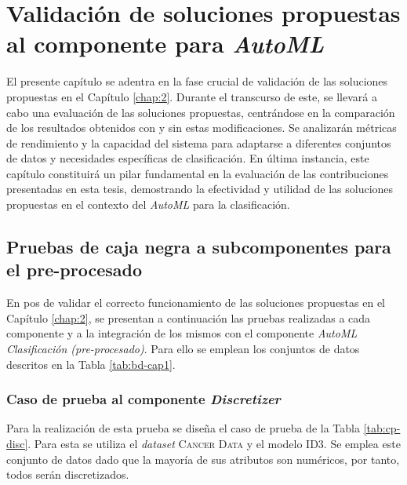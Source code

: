 \chapter{Validación de soluciones propuestas al componente para \textit{AutoML}}\label{chap:3}
El presente capítulo se adentra en la fase crucial de validación de las soluciones propuestas en el Capítulo \ref{chap:2}. Durante el transcurso de este, se llevará a cabo una evaluación de las soluciones propuestas, centrándose en la comparación de los resultados obtenidos con y sin estas modificaciones. Se analizarán métricas de rendimiento y la capacidad del sistema para adaptarse a diferentes conjuntos de datos y necesidades específicas de clasificación. En última instancia, este capítulo constituirá un pilar fundamental en la evaluación de las contribuciones presentadas en esta tesis, demostrando la efectividad y utilidad de las soluciones propuestas en el contexto del \textit{AutoML} para la clasificación.

\section{Pruebas de caja negra a subcomponentes para el pre-procesado}
En pos de validar el correcto funcionamiento de las soluciones propuestas en el Capítulo \ref{chap:2}, se presentan a continuación las pruebas realizadas a cada componente y a la integración de los mismos con el componente \textit{AutoML Clasificación (pre-procesado)}. Para ello se emplean los conjuntos de datos descritos en la Tabla \ref{tab:bd-cap1}.

\subsection{Caso de prueba al componente \textit{Discretizer}}

Para la realización de esta prueba se diseña el caso de prueba de la Tabla \ref{tab:cp-disc}. Para esta se utiliza el \textit{dataset} \textsc{Cancer Data} y el modelo ID3. Se emplea este conjunto de datos dado que la mayoría de sus atributos son numéricos, por tanto, todos serán discretizados.

